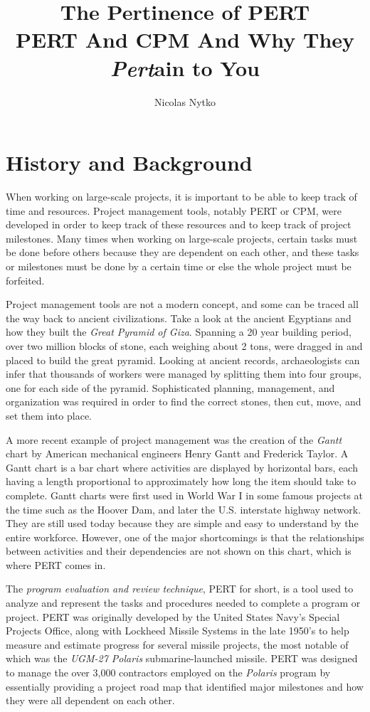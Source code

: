 \documentclass[12pt]{article}
\title{The Pertinence of PERT \\[0.25in]
  \small PERT And CPM And Why They \textit{Pert}ain to You}
\author{Nicolas Nytko}
\begin{document}
\maketitle
\newpage

\doublespacing

\section{History and Background}
When working on large-scale projects, it is important to be able to keep track of time and resources.
Project management tools, notably PERT or CPM, were developed in order to keep track of these resources and to keep track of project milestones.
Many times when working on large-scale projects, certain tasks must be done before others because they are dependent on each other, and these tasks or milestones must be done by a certain time or else the whole project must be forfeited.

Project management tools are not a modern concept, and some can be traced all the way back to ancient civilizations.  Take a look at the ancient Egyptians and how they built the \textit{Great Pyramid of Giza}.  Spanning a 20 year building period, over two million blocks of stone, each weighing about 2 tons, were dragged in and placed to build the great pyramid.  Looking at ancient records, archaeologists can infer that thousands of workers were managed by splitting them into four groups, one for each side of the pyramid.  Sophisticated planning, management, and organization was required in order to find the correct stones, then cut, move, and set them into place.

A more recent example of project management was the creation of the \textit{Gantt} chart by American mechanical engineers Henry Gantt and Frederick Taylor.
A Gantt chart is a bar chart where activities are displayed by horizontal bars, each having a length proportional to approximately how long the item should take to complete.
Gantt charts were first used in World War I in some famous projects at the time such as the Hoover Dam, and later the U.S. interstate highway network.
They are still used today because they are simple and easy to understand by the entire workforce.
However, one of the major shortcomings is that the relationships between activities and their dependencies are not shown on this chart, which is where PERT comes in.

The \textit{program evaluation and review technique}, PERT for short, is a tool used to analyze and represent the tasks and procedures needed to complete a program or project.
PERT was originally developed by the United States Navy's Special Projects Office, along with Lockheed Missile Systems in the late 1950's to help measure and estimate progress for several missile projects, the most notable of which was the \textit{UGM-27 Polaris} submarine-launched missile.
PERT was designed to manage the over 3,000 contractors employed on the \textit{Polaris} program by essentially providing a project road map that identified major milestones and how they were all dependent on each other.
\end{document}
